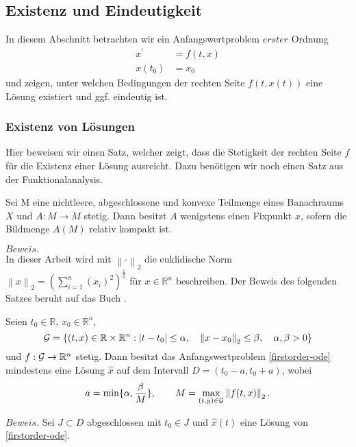 \subsection{Existenz und Eindeutigkeit}
In diesem Abschnitt betrachten wir ein Anfangswertproblem $erster$ Ordnung
\begin{align}
    x^{\prime}&=f(t,x) \nonumber \\
    x(t_{0})&=x_{0} \label{firstorder-ode}
\end{align}
und zeigen, unter welchen Bedingungen der rechten Seite $f(t,x(t))$ eine Lösung existiert und ggf. eindeutig ist.

\subsubsection{Existenz von Lösungen}
Hier beweisen wir einen Satz, welcher zeigt, dass die Stetigkeit der rechten Seite $f$ für die Existenz einer
Lösung ausreicht. Dazu benötigen wir noch einen Satz aus der Funktionalanalysis.
\begin{satz}
    \label{fixpunktsatzvonschauder}
    Sei M eine nichtleere, abgeschlossene und konvexe Teilmenge eines Banachraums $X$ und $A:M \rightarrow M$ stetig.
    Dann besitzt $A$ wenigstens einen Fixpunkt $x$, sofern die Bildmenge $A(M)$ relativ kompakt ist.
\end{satz}
$Beweis.$ \cite[13,14]{sundermeierFixpunktsatzSchauder}\\
In dieser Arbeit wird mit $\left\lVert \cdot \right\rVert_2$ die euklidische Norm
$\left\lVert x \right\rVert_2 = \left( \sum_{i=1}^{n} (x_i)^2  \right)^{\frac{1}{2}}$ für $x \in \mathbb{R}^n$
beschreiben. Der Beweis des folgenden Satzes beruht auf das Buch \cite{harroheuserGewohnlicheDifferentialgleichungen}.
\begin{satz}
\label{peano}
    Seien $t_0 \in \mathbb{R}$, $x_0 \in \mathbb{R}^n$,
    \[
        {\cal G}=\{(t,x) \in \mathbb{R} \times \mathbb{R}^{n}: |t-t_{0}| \leq \alpha, \quad
        \left\lVert x-x_{0} \right\rVert_2 \leq\beta, \quad \alpha,\beta > 0 \}
    \]
    und $f:{\cal G} \rightarrow \mathbb{R}^{n}$ stetig. Dann besitzt das Anfangswertproblem \eqref{firstorder-ode}
    mindestens eine Lösung $\hat{x}$ auf dem Intervall $D=(t_{0}-a,t_{0}+a)$, wobei
    \[
        a=\min\{\alpha, \frac{\beta}{M}\}, \qquad M= \max_{(t,y)\in {\cal G}}\left\lVert f(t,x)\right\rVert_2.
    \]
\end{satz}
$Beweis.$ Sei $J\subset D$ abgeschlossen mit $t_0 \in J$ und $\hat{x}(t)$ eine Lösung von \eqref{firstorder-ode}.
